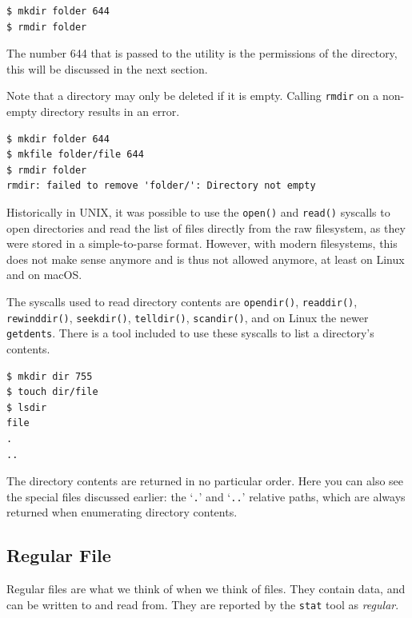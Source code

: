 \documentclass[a4paper]{article}
\begin{document}
\begin{verbatim}
$ mkdir folder 644
$ rmdir folder  
\end{verbatim}
The number 644 that is passed to the utility is the permissions of the directory, this will be discussed in the next section. 

Note that a directory may only be deleted if it is empty. Calling \verb|rmdir| on a non-empty directory results in an error.


\begin{verbatim}
$ mkdir folder 644
$ mkfile folder/file 644
$ rmdir folder
rmdir: failed to remove 'folder/': Directory not empty
\end{verbatim}
Historically in UNIX, it was possible to use the \verb|open()| and \verb|read()| syscalls to open directories and read the list of files directly from the raw filesystem, as they were stored in a simple-to-parse format. However, with modern filesystems, this does not make sense anymore and is thus not allowed anymore, at least on Linux and on macOS.


The syscalls used to read directory contents are \verb|opendir()|, \verb|readdir()|, \verb|rewinddir()|, \verb|seekdir()|, \verb|telldir()|, \verb|scandir()|, and on Linux the newer \verb|getdents|. There is a tool included to use these syscalls to list a directory's contents.

\begin{verbatim}
$ mkdir dir 755
$ touch dir/file
$ lsdir
file
.
..
\end{verbatim}
The directory contents are returned in no particular order. Here you can also see the special files discussed earlier: the ‘\texttt{.}’ and ‘\texttt{..}’ relative paths, which are always returned when enumerating directory contents.

\subsection{Regular File}

Regular files are what we think of when we think of files. They contain data, and can be written to and read from. They are reported by the \verb|stat| tool as \emph{regular}.
\end{document}
